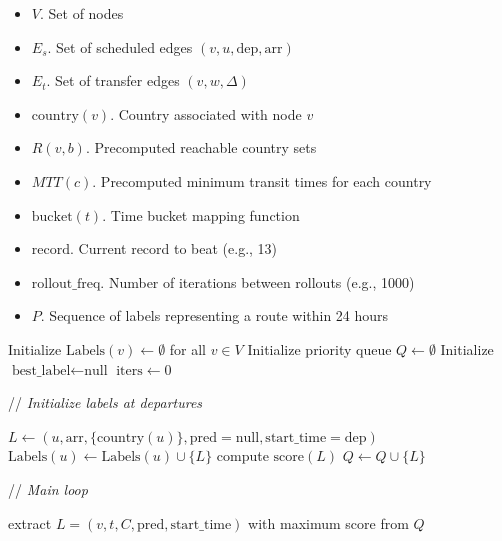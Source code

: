 \documentclass{article}
\newcommand{\CommentLine}[1]{
    \State // \textit{#1}
}
\begin{document}
\begin{algorithmic}[1] %
    
    \Input
    \begin{itemize}
        \item $V$. Set of nodes
        \item $E_s$. Set of scheduled edges $(v,u,\text{dep},\text{arr})$
        \item $E_t$. Set of transfer edges $(v,w,\Delta)$
        \item $\text{country}(v)$. Country associated with node $v$
        \item $R(v,b)$. Precomputed reachable country sets
        \item $MTT(c)$. Precomputed minimum transit times for each country
        \item $\text{bucket}(t)$. Time bucket mapping function
        \item $\text{record}$. Current record to beat (e.g., 13)
        \item $\text{rollout\_freq}$. Number of iterations between rollouts (e.g., 1000)
    \end{itemize}

    \Output
    \begin{itemize}
        \item $P$. Sequence of labels representing a route within 24 hours
    \end{itemize}
    \vspace{0.5em} 

    \State Initialize $\text{Labels}(v) \leftarrow \emptyset$ for all $v \in V$
    \State Initialize priority queue $Q \leftarrow \emptyset$ 
    \State Initialize $\text{best\_label} \leftarrow \text{null}$
    \State $\text{iters} \leftarrow 0$ 

    \vspace{0.5em}
    \CommentLine{Initialize labels at departures}
            \State $L \leftarrow (u,\text{arr},\{\text{country}(u)\},\text{pred}=\text{null},\text{start\_time}=\text{dep})$
            \State $\text{Labels}(u) \leftarrow \text{Labels}(u) \cup \{L\}$
            \State compute $\text{score}(L)$
            \State $Q \leftarrow Q \cup \{L\}$
        \EndFor
    \EndFor

    \vspace{0.5em}
    \CommentLine{Main loop}
        \State extract $L=(v,t,C,\text{pred},\text{start\_time})$ with maximum score from $Q$


\end{algorithmic}
\end{document}
